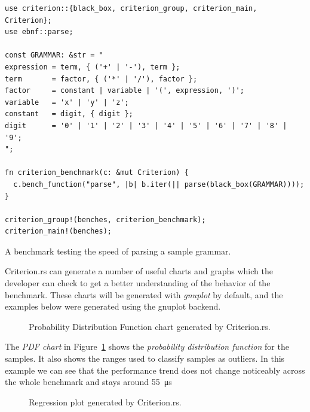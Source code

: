 \documentclass[english,bachelors,forcepolishlogotype]{wizthesis}
\begin{document}
\begin{listing}[H]
  \begin{verbatim}
use criterion::{black_box, criterion_group, criterion_main, Criterion};
use ebnf::parse;

const GRAMMAR: &str = "
expression = term, { ('+' | '-'), term };
term       = factor, { ('*' | '/'), factor };
factor     = constant | variable | '(', expression, ')';
variable   = 'x' | 'y' | 'z';
constant   = digit, { digit };
digit      = '0' | '1' | '2' | '3' | '4' | '5' | '6' | '7' | '8' | '9';
";

fn criterion_benchmark(c: &mut Criterion) {
  c.bench_function("parse", |b| b.iter(|| parse(black_box(GRAMMAR))));
}

criterion_group!(benches, criterion_benchmark);
criterion_main!(benches);
  \end{verbatim}
  \caption{A benchmark testing the speed of parsing a sample grammar.}
  \label{lst:benchmark}
\end{listing}

Criterion.rs can generate a number of useful charts and graphs which the
developer can check to get a better understanding of the behavior of the
benchmark. These charts will be generated with \emph{gnuplot} by default, and
the examples below were generated using the gnuplot backend.

\begin{figure}[H]
  \centering
  \resizebox{\textwidth}{!}{\footnotesize}
  \caption{Probability Distribution Function chart generated by Criterion.rs.}
  \label{fig:pdf-benchmark}
\end{figure}

The \emph{PDF chart} in Figure~\ref{fig:pdf-benchmark} shows the
\emph{probability distribution function} for the samples. It also shows the
ranges used to classify samples as outliers. In this example we can see that the
performance trend does not change noticeably across the whole benchmark and
stays around \SI{55}{\micro\second}

\begin{figure}[H]
  \centering
  \resizebox{\textwidth}{!}{\footnotesize}
  \caption{Regression plot generated by Criterion.rs.}
  \label{fig:regression-benchmark}
\end{figure}
\end{document}
